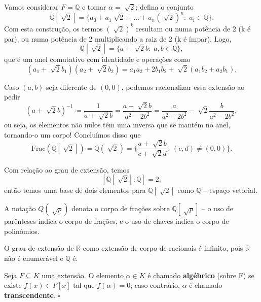 \documentclass[../algebraIII_notes.tex]{subfiles}
\begin{document}
\begin{example}
	Vamos considerar \(F=\mathbb{Q}\) e tomar \(\alpha=\sqrt[]{2}\); defina o conjunto
	\[
		\mathbb{Q}[\sqrt[]{2}] = \{a_{0}+a_1\sqrt[]{2}+\dotsc +a_{n}(\sqrt[]{2})^{n}:\; a_{i}\in \mathbb{Q}\}.
	\]
	Com esta construção, os termos \((\sqrt[]{2})^{k}\) resultam ou numa potência de 2 (k é par), ou numa potência de 2 multiplicando a raiz de 2 (k é ímpar). Logo,
	\[
		\mathbb{Q}[\sqrt[]{2}]=\{a+\sqrt[]{2}b:\; a, b\in \mathbb{Q}\},
	\]
	que é um anel comutativo com identidade e operações como
	\[
		(a_1+\sqrt[]{2}b_1)(a_2+\sqrt[]{2}b_2)=a_1a_2+2b_1b_2+\sqrt[]{2}(a_1b_2+a_2b_1).
	\]

	Caso \((a, b)\) seja diferente de \((0, 0)\), podemos racionalizar essa extensão ao pedir
	\[
		(a+\sqrt[]{2}b)^{-1}\coloneqq \frac{1}{a+ \sqrt[]{2}b} = \frac{a-\sqrt[]{2}b}{a^{2}-2b^{2}} = \frac{a}{a^{2}-2b^{2}}-\sqrt[]{2}\frac{b}{a^{2}-2b^{2}},
	\]
	ou seja, os elementos não nulos têm uma inversa que se mantém no anel, tornando-o um corpo! Concluímos disso que
	\[
		\mathrm{Frac}(\mathbb{Q}[\sqrt[]{2}]) = \mathbb{Q}(\sqrt[]{2}) = \biggl\{\frac{a+\sqrt[]{2}b}{c+\sqrt[]{2}d}:\; (c, d)\neq (0,0)\biggr\}.
	\]

	Com relação ao grau de extensão, temos
	\[
		[\mathbb{Q}[\sqrt[]{2}]: \mathbb{Q}]=2,
	\]
	então temos uma base de dois elementos para \(\mathbb{Q}[\sqrt[]{2}]\) como \(\mathbb{Q}-\)espaço vetorial.
\end{example}
\begin{tcolorbox}[
		skin=enhanced,
		title=Observação,
		fonttitle=\bfseries,
		colframe=black,
		colbacktitle=cyan!75!white,
		colback=cyan!15,
		colbacklower=black,
		coltitle=black,
		drop fuzzy shadow,
	]
	A notação \(Q(\sqrt[]{p})\) denota o corpo de frações sobre \(\mathbb{Q}[\sqrt[]{p}]\) -- o uso de parênteses indica o corpo de frações, e o uso de chaves indica o corpo de polinômios.
\end{tcolorbox}

\begin{example}
	O grau de extensão de \(\mathbb{R}\) como extensão de corpo de racionais é infinito, pois \(\mathbb{R}\) não é enumerável e \(\mathbb{Q}\) é.
\end{example}

\begin{def*}
	Seja \(F\subseteq K\) uma extensão. O elemento \(\alpha \in K\) é chamado \textbf{algébrico} (sobre F) se existe \(f(x)\in F[x]\) tal que \(f(\alpha )=0\); caso contrário, \(\alpha \) é chamado \textbf{transcendente}. \(\square\)
\end{def*}
\end{document}
